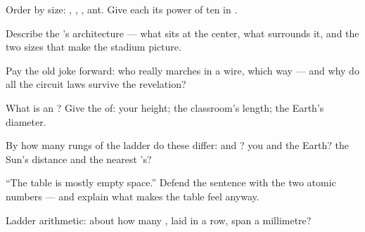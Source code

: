 \begin{exercise}[$\star$]\label{exo:g9:atoms-to-galaxies:1}
Order by size: , , , ant. Give each its
power of ten in .
\end{exercise}

\begin{exercise}[$\star$]\label{exo:g9:atoms-to-galaxies:2}
Describe the 's architecture --- what sits at the
center, what surrounds it, and the two sizes that make the
stadium picture.
\end{exercise}

\begin{exercise}[$\star$]\label{exo:g9:atoms-to-galaxies:3}
Pay the old joke forward: who really marches in a wire,
which way --- and why do all the circuit laws survive the
revelation?
\end{exercise}

\begin{exercise}[$\star$]\label{exo:g9:atoms-to-galaxies:4}
What is an ? Give the 
of: your height; the classroom's length; the Earth's
diameter.
\end{exercise}

\begin{exercise}[$\star$]\label{exo:g9:atoms-to-galaxies:5}
By how many rungs of the ladder do these differ:  and
? you and the Earth? the Sun's distance and the
nearest 's?
\end{exercise}

\begin{exercise}[$\star$]\label{exo:g9:atoms-to-galaxies:6}
``The table is mostly empty space.'' Defend the sentence
with the two atomic numbers --- and explain what makes the
table feel  anyway.
\end{exercise}

\begin{exercise}[$\star$]\label{exo:g9:atoms-to-galaxies:7}
Ladder arithmetic: about how many , laid in a row,
span a millimetre?
\end{exercise}

